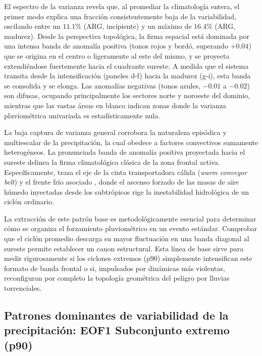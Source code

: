 El espectro de la varianza revela que, al promediar la climatología entera, el primer modo explica una fracción consistentemente baja de la variabilidad, oscilando entre un $11.1\%$ (ARG, incipiente) y un máximo de $16.4\%$ (ARG, madurez). Desde la perspectiva topológica, la firma espacial está dominada por una intensa banda de anomalía positiva (tonos rojos y bordó, superando $+0.04$) que se origina en el centro o ligeramente al este del mismo, y se proyecta extendiéndose fuertemente hacia el cuadrante sureste. A medida que el sistema transita desde la intensificación (paneles d-f) hacia la madurez (g-i), esta banda se consolida y se elonga. Las anomalías negativas (tonos azules, $-0.01$ a $-0.02$) son difusas, ocupando principalmente los sectores norte y noroeste del dominio, mientras que las vastas áreas en blanco indican zonas donde la varianza pluviométrica univariada es estadísticamente nula.

La baja captura de varianza general corrobora la naturaleza episódica y multiescalar de la precipitación, la cual obedece a factores convectivos sumamente heterogéneos. La pronunciada banda de anomalía positiva proyectada hacia el sureste delinea la firma climatológica clásica de la zona frontal activa. Específicamente, traza el eje de la cinta transportadora cálida (\textit{warm conveyor belt}) y el frente frío asociado , donde el ascenso forzado de las masas de aire húmedo inyectadas desde los subtrópicos rige la inestabilidad hidrológica de un ciclón ordinario.

La extracción de este patrón base es metodológicamente esencial para determinar cómo se organiza el forzamiento pluviométrico en un evento estándar. Comprobar que el ciclón promedio descarga su mayor fluctuación en una banda diagonal al sureste permite establecer un canon estructural. Esta línea de base sirve para medir rigurosamente si los ciclones extremos (p90) simplemente intensifican este formato de banda frontal o si, impulsados por dinámicas más violentas, reconfiguran por completo la topología geométrica del peligro por lluvias torrenciales.

\vspace{1em}

\subsection{Patrones dominantes de variabilidad de la precipitación: EOF1 Subconjunto extremo (p90)}\label{subsec:eof1_tp_p90}

